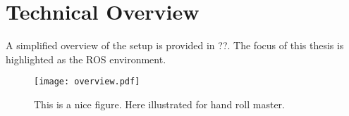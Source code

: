 \section{Technical Overview}
A simplified overview of the setup is provided in ??. The focus of this thesis is highlighted as the ROS environment.
\begin{figure}[H]
\center
\texttt{[image: overview.pdf]}
\caption{This is a nice figure. Here illustrated for hand roll master.}
\end{figure}
